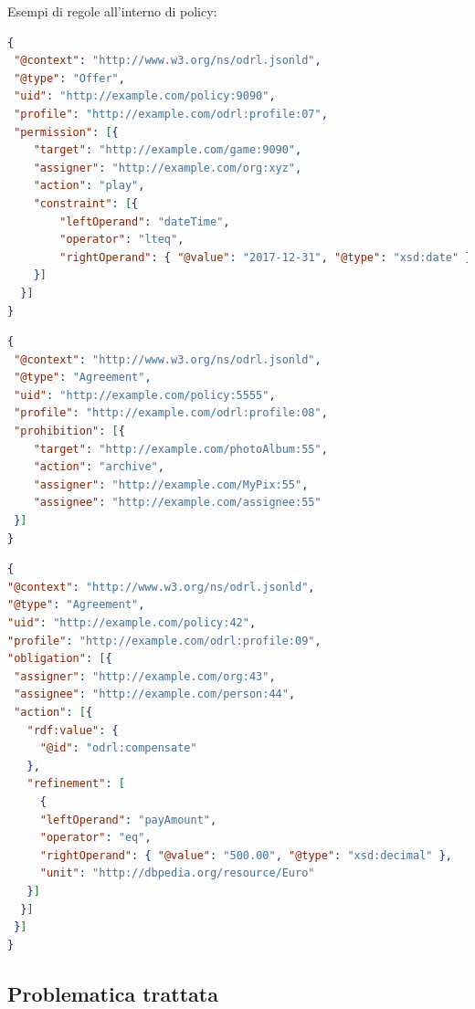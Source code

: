 \documentclass[12pt,a4paper,twoside]{book}
\begin{document}
Esempi di regole all'interno di policy:
\begin{lstlisting}[language=json,firstnumber=1,caption={La regola esprime il permesso di eseguire l'azione \textbf{play} sul target fino al giorno 2017-12-31 compreso},captionpos=b,label=esempioPerm]
{
 "@context": "http://www.w3.org/ns/odrl.jsonld",
 "@type": "Offer",
 "uid": "http://example.com/policy:9090",
 "profile": "http://example.com/odrl:profile:07",
 "permission": [{
    "target": "http://example.com/game:9090",
    "assigner": "http://example.com/org:xyz",
    "action": "play",
    "constraint": [{
        "leftOperand": "dateTime",
        "operator": "lteq",
        "rightOperand": { "@value": "2017-12-31", "@type": "xsd:date" }
    }]
  }]
}
\end{lstlisting}
\begin{lstlisting}[language=json,firstnumber=1,caption={La regola esprime il divieto di eseguire l'azione \textbf{archive} sul target},captionpos=b,label=esempioPro]
{
 "@context": "http://www.w3.org/ns/odrl.jsonld",
 "@type": "Agreement",
 "uid": "http://example.com/policy:5555",
 "profile": "http://example.com/odrl:profile:08",
 "prohibition": [{
	"target": "http://example.com/photoAlbum:55",
	"action": "archive",
	"assigner": "http://example.com/MyPix:55",
	"assignee": "http://example.com/assignee:55"
 }]
}
\end{lstlisting}

\begin{lstlisting}[language=json,firstnumber=1,caption={La regola esprime l'obbligo di eseguire l'azione \textbf{compensate}, specificando come \textbf{refinement} l'ammontare del pagamento},captionpos=b,label=esempioDuty]
{
"@context": "http://www.w3.org/ns/odrl.jsonld",
"@type": "Agreement",
"uid": "http://example.com/policy:42",
"profile": "http://example.com/odrl:profile:09",
"obligation": [{
 "assigner": "http://example.com/org:43",
 "assignee": "http://example.com/person:44",
 "action": [{
   "rdf:value": {
     "@id": "odrl:compensate"
   },
   "refinement": [
     {
     "leftOperand": "payAmount",
     "operator": "eq",
     "rightOperand": { "@value": "500.00", "@type": "xsd:decimal" },
     "unit": "http://dbpedia.org/resource/Euro"
   }]
  }]
 }]
}
\end{lstlisting}
\subsection{Problematica trattata}\label{problematiche}
\end{document}
